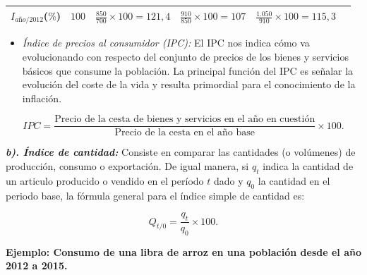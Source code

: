 \documentclass[
]{book}
\providecommand{\tightlist}{%
  \setlength{\itemsep}{0pt}\setlength{\parskip}{0pt}}
\begin{document}
\begin{longtable}[]{@{}llllll@{}}
\begin{minipage}[t]{0.14\columnwidth}
\(I_{año/2012}\)(\(\%\))\strut
\end{minipage} & \begin{minipage}[t]{0.11\columnwidth}\raggedright
\(100\)\strut
\end{minipage} & \begin{minipage}[t]{0.13\columnwidth}\raggedright
\(\frac{850}{700}\times 100=121,4\)\strut
\end{minipage} & \begin{minipage}[t]{0.16\columnwidth}\raggedright
\(\frac{910}{850}\times 100=107\)\strut
\end{minipage} & \begin{minipage}[t]{0.14\columnwidth}\raggedright
\(\frac{1.050}{910}\times 100=115,3\)\strut
\end{minipage} & \begin{minipage}[t]{0.14\columnwidth}\raggedright
\strut
\end{minipage}\tabularnewline
\bottomrule
\end{longtable}

\begin{itemize}
\tightlist
\item
  \emph{Índice de precios al consumidor (IPC):} El IPC nos indica cómo va evolucionando con respecto del conjunto de precios de los bienes y servicios básicos que consume la población. La principal función del IPC es señalar la evolución del coste de la vida y resulta primordial para el conocimiento de la inflación.
\end{itemize}

\[\begin{equation}
IPC=\frac{\text{Precio de la cesta de bienes y servicios en el año en cuestión}}{\text{Precio de la cesta en el año base}}\times 100.
\end{equation}\]

\textbf{\emph{b). Índice de cantidad:}} Consiste en comparar las cantidades (o volúmenes) de producción, consumo o exportación.
De igual manera, si \(q_{t}\) indica la cantidad de un articulo producido o vendido en el período \(t\) dado y \(q_{0}\) la cantidad en el periodo base, la fórmula general para el índice simple de cantidad es:

\[\begin{equation}
Q_{t/0}=\frac{q_{t}}{q_{0}}\times 100.
\end{equation}\]

\textbf{Ejemplo: Consumo de una libra de arroz en una población desde el año 2012 a 2015.}
\end{document}
